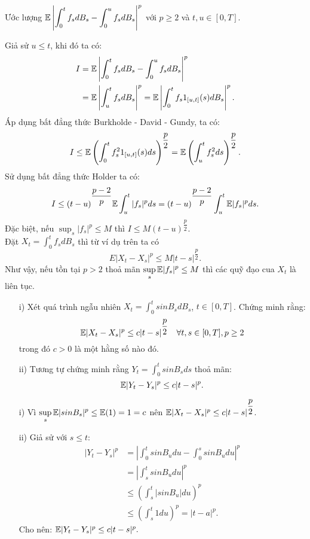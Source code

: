 \begin{exam*}
Ước lượng $\mathbb{E} \left|\displaystyle \int_0^t f_s dB_s - \displaystyle \int_0^u f_s dB_s \right|^p$ với $p \geq 2$ và $t,u \in [0,T]$.
\begin{sol*}
    Giả sử $u \leq t$, khi đó ta có:
    \begin{align*}
         I &= \mathbb{E} \left|\displaystyle \int_0^t f_s dB_s - \displaystyle \int_0^u f_s dB_s \right|^p\\
         &= \mathbb{E} \left|\displaystyle \int_u^t f_s dB_s \right|^p = \mathbb{E} \left|\displaystyle \int_0^t f_s 1_{[u,t]}(s) dB_s \right|^p.
    \end{align*}
   Áp dụng bất đẳng thức Burkholde - David - Gundy, ta có:
   \[I \leq \mathbb{E} \left(\displaystyle \int_0^t f_s^2 1_{[u,t]}(s) ds \right)^{\dfrac{p}{2}} = \mathbb{E} \left(\displaystyle \int_u^t f_s^2 ds \right)^{\dfrac{p}{2}}.\]
   Sử dụng bất đẳng thức Holder ta có:
   \[I \leq (t-u)^{\dfrac{p-2}{p}} \mathbb{E} \displaystyle \int_u^t |f_s|^p ds = (t-u)^{\dfrac{p-2}{p}} \displaystyle \int_u^t \mathbb{E} |f_s|^p ds. \]
   Đặc biệt, nếu $\displaystyle\sup_s |f_s|^p \leq M$ thì $I \leq M (t-u)^{\dfrac{p}{2}}$.\\  
Đặt $X_t = \displaystyle \int_0^t f_s dB_s$ thì từ ví dụ trên ta có
\[E \left|X_t-X_s\right|^p \leq M|t-s|^{\dfrac{p}{2}}.\]
Như vậy, nếu tồn tại $p>2$ thoả mãn $\displaystyle\sup_s \mathbb{E} |f_s|^p \leq M$ thì các quỹ đạo cua $X_t$ là liên tục.
\end{sol*}
\end{exam*}
\begin{exam*}
\begin{itemize}
    \item[i)] Xét quá trình ngẫu nhiên $X_t = \displaystyle \int_0^t sinB_s dB_s$, $t \in [0,T]$. Chứng minh rằng: 
    \[\mathbb{E} |X_t-X_s|^p \leq c |t-s|^{\dfrac{p}{2}} \quad \forall t,s \in [0,T], p \geq 2\]
    trong đó $c>0$ là một hằng số nào đó.
    \item[ii)] Tương tự chứng minh rằng  $Y_t = \displaystyle \int_0^t sinB_s ds$ thoả mãn:
    \[\mathbb{E} |Y_t-Y_s|^p \leq c |t-s|^p.\]
\end{itemize}
\begin{sol*}
    \begin{itemize}
        \item[i)] Vì $\displaystyle\sup_s \mathbb{E} |sinB_s|^p \leq \mathbb{E}(1) = 1 = c$ nên $\mathbb{E} |X_t-X_s|^p \leq c |t-s|^{\dfrac{p}{2}}$.
        \item[ii)] Giả sử với $s \leq t$:
        \begin{align*}
            |Y_t-Y_s|^p &= \left|\displaystyle \int_0^t sinB_u du - \displaystyle \int_0^s sinB_u du \right|^p\\
            &= \left|\displaystyle \int_s^t sinB_u du \right|^p\\
            &\leq \left(\displaystyle \int_s^t |sinB_u| du \right)^p\\
            &\leq \left(\displaystyle \int_s^t 1 du \right)^p = |t-a|^p.   
        \end{align*}
        Cho nên: $\mathbb{E} |Y_t-Y_s|^p \leq c |t-s|^p.$
    \end{itemize}
\end{sol*}
\end{exam*}
